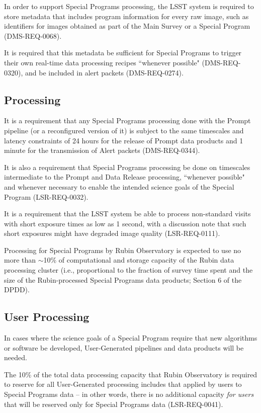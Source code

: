 In order to support Special Programs processing, the LSST system is 
required to store metadata that includes program information for every raw 
image, such as identifiers for images obtained as part of the Main Survey 
or a Special Program (DMS-REQ-0068).

It is required that this metadata be sufficient for Special Programs to 
trigger their own real-time data processing recipes ``whenever possible" 
(DMS-REQ-0320), and be included in alert packets (DMS-REQ-0274).


\subsection{Processing}\label{ssec:req_proc}

It is a requirement that any Special Programs processing done with the 
Prompt pipeline (or a reconfigured version of it) is subject to the same 
timescales and latency constraints of 24 hours for the release of Prompt 
data products and 1 minute for the transmission of Alert packets 
(DMS-REQ-0344).

It is also a requirement that Special Programs processing be done on 
timescales intermediate to the Prompt and Data Release processing, 
``whenever possible" and whenever necessary to enable the intended science 
goals of the Special Program (LSR-REQ-0032).

It is a requirement that the LSST system be able to process non-standard 
visits with short exposure times as low as 1 second, with a discussion 
note that such short exposures might have degraded image quality 
(LSR-REQ-0111).

Processing for Special Programs by Rubin Observatory is expected to use no 
more than $\sim$10\% of computational and storage capacity of the Rubin 
data processing cluster (i.e., proportional to the fraction of survey time 
spent and the size of the Rubin-processed Special Programs data products; 
Section 6 of the DPDD).


\subsection{User Processing}\label{ssec:req_ug}

In cases where the science goals of a Special Program require that new 
algorithms or software be developed, User-Generated pipelines and data 
products will be needed.

The 10\% of the total data processing capacity that Rubin Observatory is 
required to reserve for all User-Generated processing includes that 
applied by users to Special Programs data -- in other words, there is no 
additional capacity {\it for users} that will be reserved only for Special 
Programs data (LSR-REQ-0041).
